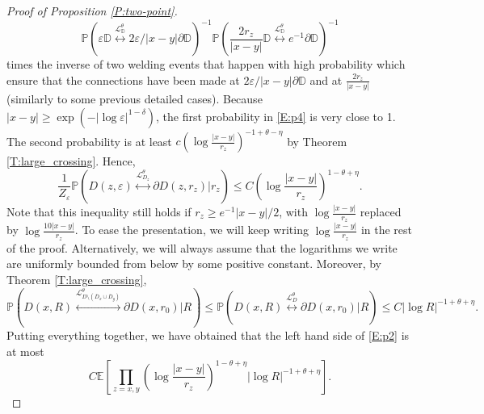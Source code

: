 \documentclass[11pt]{article}
\theoremstyle{remark}
\newcommand{\D}{\mathbb{D}}
\newcommand{\Lc}{\mathcal{L}}
\newcommand{\Expect}[1]{\mathbb{E} \left[ #1 \right] }
\newcommand{\Prob}[1]{\mathbb{P} \left( #1 \right) }
\newcommand{\eps}{\varepsilon}
\numberwithin{equation}{section}
\begin{document}
\begin{proof}[Proof of Proposition \ref{P:two-point}]
\begin{equation}
\label{E:p4}
\Prob{ \eps \D \overset{\Lc_{\D}^\theta}{\longleftrightarrow} 2 \eps/ |x-y| \partial \D}^{-1}
\Prob{ \frac{2r_z}{|x-y|} \D \overset{\Lc_{\D}^\theta}{\longleftrightarrow} e^{-1} \partial \D}^{-1}
\end{equation}
times the inverse of two welding events that happen with high probability which ensure that the connections have been made at $2 \eps/ |x-y| \partial \D$ and at $\frac{2r_z}{|x-y|}$ (similarly to some previous detailed cases). Because $|x-y| \geq \exp \left( - |\log \eps|^{1-\delta} \right)$, the first probability in \eqref{E:p4} is very close to 1. The second probability is at least $c ( \log \frac{|x-y|}{r_z} )^{-1+\theta-\eta}$ by Theorem \ref{T:large_crossing}. Hence,
\[
\frac{1}{Z_\eps} \Prob{ D(z,\eps) \overset{\Lc_{D_z}^\theta}{\longleftrightarrow} \partial D(z,r_z) \Big\vert r_z } \leq C \left( \log \frac{|x-y|}{r_z} \right)^{1-\theta + \eta}.
\]
Note that this inequality still holds if $r_z \geq e^{-1}|x-y|/2$, with $\log \frac{|x-y|}{r_z}$ replaced by $\log \frac{10|x-y|}{r_z}$. To ease the presentation, we will keep writing $\log \frac{|x-y|}{r_z}$ in the rest of the proof. Alternatively, we will always assume that the logarithms we write are uniformly bounded from below by some positive constant.
Moreover, by Theorem \ref{T:large_crossing},
\[
\Prob{ D(x,R) \overset{\Lc_{D \setminus (\bar{D}_x \cup \bar{D}_y)}^\theta}{\longleftrightarrow} \partial D(x,r_0) \vert R } \leq \Prob{ D(x,R) \overset{\Lc_{D}^\theta}{\longleftrightarrow} \partial D(x,r_0) \vert R }
\leq C | \log R |^{-1+\theta + \eta}.
\]
Putting everything together, we have obtained that the left hand side of \eqref{E:p2} is at most
\begin{equation}
\label{E:p5}
C \Expect{ \prod_{z=x,y} \left( \log \frac{|x-y|}{r_z} \right)^{1-\theta + \eta}
| \log R |^{-1+\theta + \eta} }.
\end{equation}


\end{proof}
\end{document}
